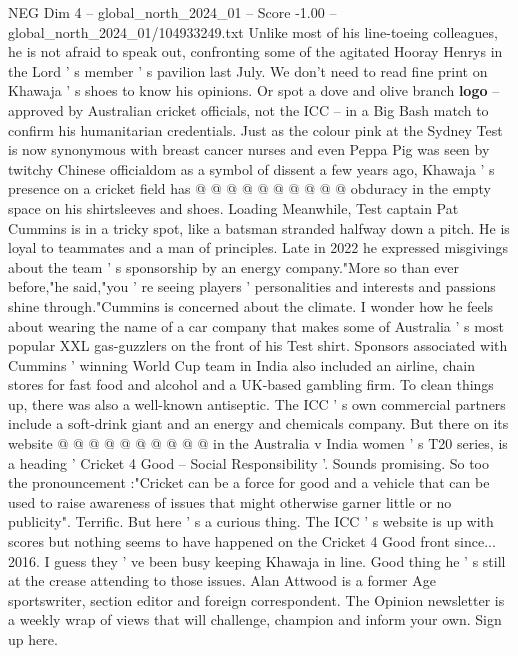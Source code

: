 \begin{textsample}{NEG Dim 4 – global\_north\_2024\_01 – Score -1.00 – global\_north\_2024\_01/104933249.txt}
Unlike most of his line-toeing colleagues, he is not afraid to speak out, confronting some of the agitated Hooray Henrys in the Lord ' s member ' s pavilion last July.
We don't need to read fine print on Khawaja ' s shoes to know his opinions.
Or spot a dove and olive branch \textbf{logo} -- approved by Australian cricket officials, not the ICC -- in a Big Bash match to confirm his humanitarian credentials.
Just as the colour pink at the Sydney Test is now synonymous with breast cancer nurses and even Peppa Pig was seen by twitchy Chinese officialdom as a symbol of dissent a few years ago, Khawaja ' s presence on a cricket field has @ @ @ @ @ @ @ @ @ @ obduracy in the empty space on his shirtsleeves and shoes.
Loading Meanwhile, Test captain Pat Cummins is in a tricky spot, like a batsman stranded halfway down a pitch.
He is loyal to teammates and a man of principles.
Late in 2022 he expressed misgivings about the team ' s sponsorship by an energy company."More so than ever before,"he said,"you ' re seeing players ' personalities and interests and passions shine through."Cummins is concerned about the climate.
I wonder how he feels about wearing the name of a car company that makes some of Australia ' s most popular XXL gas-guzzlers on the front of his Test shirt.
Sponsors associated with Cummins ' winning World Cup team in India also included an airline, chain stores for fast food and alcohol and a UK-based gambling firm.
To clean things up, there was also a well-known antiseptic.
The ICC ' s own commercial partners include a soft-drink giant and an energy and chemicals company.
But there on its website @ @ @ @ @ @ @ @ @ @ in the Australia v India women ' s T20 series, is a heading ' Cricket 4 Good -- Social Responsibility '.
Sounds promising.
So too the pronouncement :"Cricket can be a force for good and a vehicle that can be used to raise awareness of issues that might otherwise garner little or no publicity".
Terrific.
But here ' s a curious thing.
The ICC ' s website is up with scores but nothing seems to have happened on the Cricket 4 Good front since... 2016.
I guess they ' ve been busy keeping Khawaja in line.
Good thing he ' s still at the crease attending to those issues.
Alan Attwood is a former Age sportswriter, section editor and foreign correspondent.
The Opinion newsletter is a weekly wrap of views that will challenge, champion and inform your own.
Sign up here.

\end{textsample}
